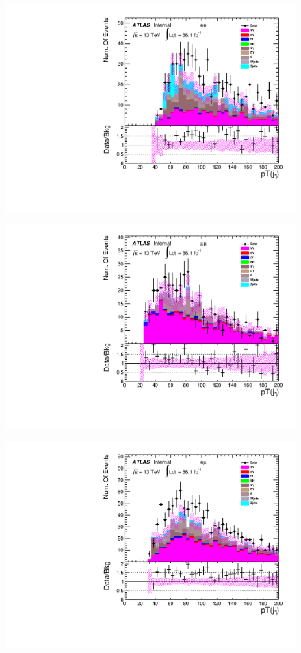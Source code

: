 \begin{figure}[h]
\begin{minipage}[t]{0.3\linewidth}
 \includegraphics[width=1.0\textwidth,angle=-90]{fig/nominal/pt_j1_ee.pdf}
 \label{fig:nominal:pt_j1_ee.pdf}
 \end{minipage}
\begin{minipage}[t]{0.3\linewidth}
 \centering
 \includegraphics[width=1.0\textwidth,angle=-90]{fig/nominal/pt_j1_mumu.pdf}
 \label{fig:nominal:pt_j1_mumu.pdf}
 \end{minipage}
\begin{minipage}[t]{0.3\linewidth}
 \centering
 \includegraphics[width=1.0\textwidth,angle=-90]{fig/nominal/pt_j1_emu.pdf}

\end{minipage}
\end{figure}
